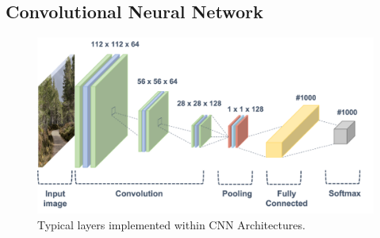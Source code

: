 






\subsection{Convolutional Neural Network}\label{sec:CNN}

\begin{figure}[!h]
    \centering
     \includegraphics[width=\linewidth]{Images/CNN.png}
    \caption{Typical layers implemented within CNN Architectures.}
    \label{fig:CNN}
\end{figure}




